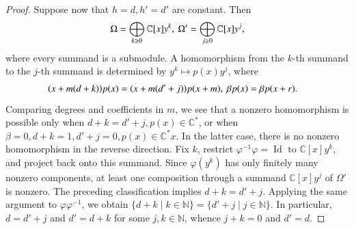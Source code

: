 \documentclass[12pt,reqno]{amsart}
\def\N{\mathbb{N}}
\def\C{\mathbb{C}}
\numberwithin{equation}{section}
\begin{document}
\begin{proof}
Suppose now that $h=d,h'=d'$ are constant. Then
 \begin{equation}\label{formula 5.7}
\aligned
\Omega=\bigoplus_{k\ge0}\mathbb C[x]y^k,\ \Omega'=\bigoplus_{j\ge0}\mathbb C[x]y^j, 
\endaligned
\end{equation}
  where every summand is a submodule. A homomorphism from the $k$-th summand to the $j$-th summand is determined by $y^k\longmapsto p(x)y^j$, where 
  \begin{equation*}\label{formula 6.2.6}
\aligned
 (x+m(d+k))p(x) &=(x+m(d'+j))p(x+m),\ \beta p(x)=\beta p(x+r). 
\endaligned
\end{equation*}
Comparing degrees and coefficients in $m$, we see that a nonzero homomorphism is possible only when 
$d+k=d'+j, p(x)\in\mathbb C^*$, or when $\beta=0,d+k=1,d'+j=0,  p(x)\in\mathbb C^*x$. In the latter case, there is no nonzero homomorphism in the reverse direction.  
  Fix $k$, restrict $\varphi^{-1}\varphi=\operatorname{Id}$ to $\C[x]y^k$, and project back onto this summand. Since $\varphi(y^k)$ has only finitely many nonzero components, at least one composition through a summand $\C[x]y^j$ of $\Omega'$ is nonzero. The preceding classification implies $d+k=d'+j$. Applying the same argument to $\varphi\varphi^{-1}$, we obtain
 $\{d+k\mid k\in\mathbb N\} =\{d'+j\mid j\in\mathbb N\}$. In particular, $d=d'+j$ and $d'=d+k$ for some $j,k\in\N$, whence $j+k=0$ and $d'=d$.


\end{proof}
\end{document}

